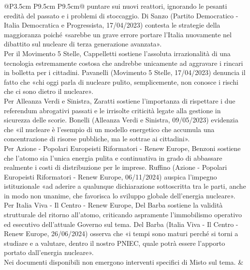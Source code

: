 \documentclass[a4paper,11pt]{article}
\begin{document}
\begin{landscape}
\begin{longtable}{@{}P{3.5cm} P{9.5cm} P{9.5cm}@{}}
puntare sui nuovi reattori, ignorando le pesanti eredità del passato e i problemi di stoccaggio. Di Sanzo (Partito Democratico - Italia Democratica e Progressista, 17/04/2023) contesta le strategie della maggioranza poiché «sarebbe un grave errore portare l'Italia nuovamente nel dibattito sul nucleare di terza generazione avanzata».\\[6pt] Per il Movimento 5 Stelle, Cappelletti sostiene l'assoluta irrazionalità di una tecnologia estremamente costosa che andrebbe unicamente ad aggravare i rincari in bolletta per i cittadini. Pavanelli (Movimento 5 Stelle, 17/04/2023) denuncia il fatto che «chi oggi parla di nucleare pulito, semplicemente, non conosce i rischi che ci sono dietro il nucleare».\\[6pt] Per Alleanza Verdi e Sinistra, Zaratti sostiene l'importanza di rispettare i due referendum abrogativi passati e le irrisolte criticità legate alla gestione in sicurezza delle scorie. Bonelli (Alleanza Verdi e Sinistra, 09/05/2023) evidenzia che «il nucleare è l'esempio di un modello energetico che accumula una concentrazione di risorse pubbliche, ma le sottrae ai cittadini».\\[6pt] Per Azione - Popolari Europeisti Riformatori - Renew Europe, Benzoni sostiene che l'atomo sia l'unica energia pulita e continuativa in grado di abbassare realmente i costi di distribuzione per le imprese. Ruffino (Azione - Popolari Europeisti Riformatori - Renew Europe, 06/11/2024) auspica l'impegno istituzionale «ad aderire a qualunque dichiarazione sottoscritta tra le parti, anche in modo non unanime, che favorisca lo sviluppo globale dell'energia nucleare».\\[6pt] Per Italia Viva - Il Centro - Renew Europe, Del Barba sostiene la validità strutturale del ritorno all'atomo, criticando aspramente l'immobilismo operativo ed esecutivo dell'attuale Governo sul tema. Del Barba (Italia Viva - Il Centro - Renew Europe, 26/06/2024) osserva che «i tempi sono maturi perché si torni a studiare e a valutare, dentro il nostro PNIEC, quale potrà essere l'apporto portato dall'energia nucleare».\\[6pt] Nei documenti disponibili non emergono interventi specifici di Misto sul tema. & \\
\midrule

\end{longtable}
\end{landscape}
\end{document}
